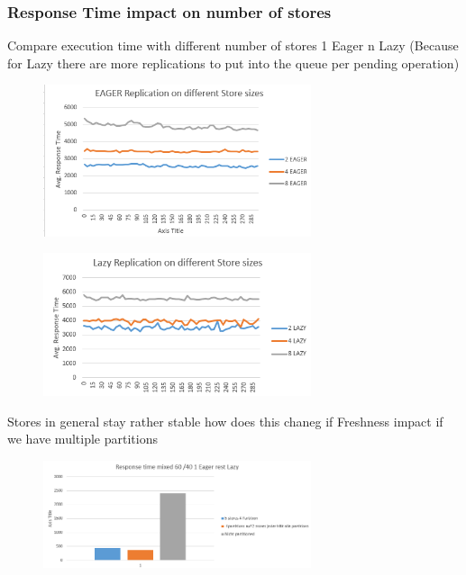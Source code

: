 
\subsubsection{Response Time impact on number of stores } 

Compare execution time with different number of stores 1 Eager n Lazy   (Because for Lazy there are more replications to put into the queue per pending operation)
\begin{figure}[t] 
    \centering 
    \includegraphics[width=0.7\textwidth]{Figures/hsql_eager_stores.PNG}
    \caption{}
    \label{fig:}
\end{figure}


\begin{figure}[t] 
    \centering 
    \includegraphics[width=0.7\textwidth]{Figures/hsql_lazy_stores.PNG}
    \caption{}
    \label{fig:}
\end{figure}


Stores in general stay rather stable how does this chaneg if 
Freshness impact if we have multiple partitions
\begin{figure}[t] 
    \centering 
    \includegraphics[width=0.7\textwidth]{Figures/partioned_freshness.PNG}
    \caption{}
    \label{fig:}
\end{figure}


